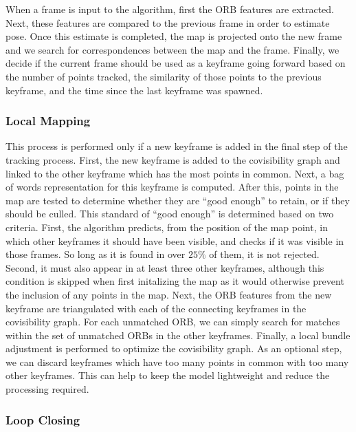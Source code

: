 When a frame is input to the algorithm, first the ORB features are extracted. Next, these features are compared to the previous frame in order to estimate pose. Once this estimate is completed, the map is projected onto the new frame and we search for correspondences between the map and the frame. Finally, we decide if the current frame should be used as a keyframe going forward based on the number of points tracked, the similarity of those points to the previous keyframe, and the time since the last keyframe was spawned.

\subsubsection{Local Mapping}

This process is performed only if a new keyframe is added in the final step of the tracking process. First, the new keyframe is added to the covisibility graph and linked to the other keyframe which has the most points in common. Next, a bag of words representation for this keyframe is computed. After this, points in the map are tested to determine whether they are ``good enough'' to retain, or if they should be culled. This standard of ``good enough'' is determined based on two criteria. First, the algorithm predicts, from the position of the map point, in which other keyframes it should have been visible, and checks if it was visible in those frames. So long as it is found in over $25\%$ of them, it is not rejected. Second, it must also appear in at least three other keyframes, although this condition is skipped when first initalizing the map as it would otherwise prevent the inclusion of any points in the map.
Next, the ORB features from the new keyframe are triangulated with each of the connecting keyframes in the covisibility graph. For each unmatched ORB, we can simply search for matches within the set of unmatched ORBs in the other keyframes. Finally, a local bundle adjustment is performed to optimize the covisibility graph.
As an optional step, we can discard keyframes which have too many points in common with too many other keyframes. This can help to keep the model lightweight and reduce the processing required.

\subsubsection{Loop Closing}

